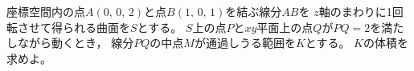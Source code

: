 \documentclass[../../main.tex]{subfiles}
\begin{document}
座標空間内の点$A(0, \, 0, \, 2)$と点$B(1, \, 0, \, 1)$を結ぶ線分$AB$を
$z$軸のまわりに1回転させて得られる曲面を$S$とする。
$S$上の点$P$と$xy$平面上の点$Q$が$PQ=2$を満たしながら動くとき，
線分$PQ$の中点$M$が通過しうる範囲を$K$とする。
$K$の体積を求めよ。
\end{document}
